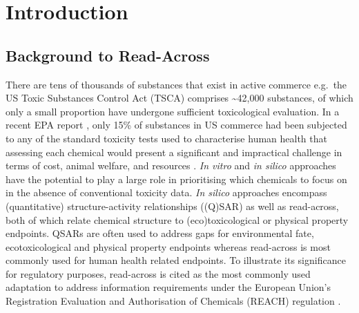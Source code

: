\documentclass[
  super,
  preprint,
  3p]{elsarticle}
\begin{document}
\section{Introduction}\label{introduction}

\subsection{Background to Read-Across}\label{sec-background}

There are tens of thousands of substances that exist in active commerce
e.g.~the US Toxic Substances Control Act (TSCA) comprises
\textasciitilde42,000 substances, of which only a small proportion have
undergone sufficient toxicological evaluation. In a recent EPA report
\citep{etap_2024}, only 15\% of substances in US commerce had been
subjected to any of the standard toxicity tests used to characterise
human health that assessing each chemical would present a significant
and impractical challenge in terms of cost, animal welfare, and
resources \citep{nrc_toxicity_1984}. \emph{In vitro} and \emph{in
silico} approaches have the potential to play a large role in
prioritising which chemicals to focus on in the absence of conventional
toxicity data. \emph{In silico} approaches encompass (quantitative)
structure-activity relationships ((Q)SAR) as well as read-across, both
of which relate chemical structure to (eco)toxicological or physical
property endpoints. QSARs are often used to address gaps for
environmental fate, ecotoxicological and physical property endpoints
whereas read-across is most commonly used for human health related
endpoints. To illustrate its significance for regulatory purposes,
read-across is cited as the most commonly used adaptation to address
information requirements under the European Union's Registration
Evaluation and Authorisation of Chemicals (REACH) regulation
\citep{eu_regulation_2006, macmillan_last_2024}.
\end{document}
